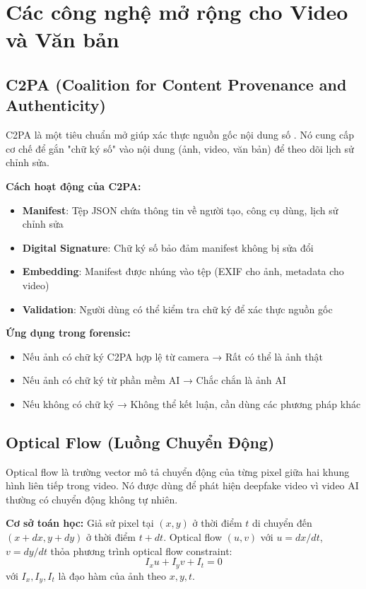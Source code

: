 \documentclass[14pt,a4paper,oneside]{report}
\begin{document}
\section{Các công nghệ mở rộng cho Video và Văn bản}

\subsection{C2PA (Coalition for Content Provenance and Authenticity)}
C2PA là một tiêu chuẩn mở giúp xác thực nguồn gốc nội dung số \cite{c2pa}. Nó cung cấp cơ chế để gắn "chữ ký số" vào nội dung (ảnh, video, văn bản) để theo dõi lịch sử chỉnh sửa.

\textbf{Cách hoạt động của C2PA:}
\begin{itemize}
  \item \textbf{Manifest}: Tệp JSON chứa thông tin về người tạo, công cụ dùng, lịch sử chỉnh sửa
  \item \textbf{Digital Signature}: Chữ ký số bảo đảm manifest không bị sửa đổi
  \item \textbf{Embedding}: Manifest được nhúng vào tệp (EXIF cho ảnh, metadata cho video)
  \item \textbf{Validation}: Người dùng có thể kiểm tra chữ ký để xác thực nguồn gốc
\end{itemize}

\textbf{Ứng dụng trong forensic:}
\begin{itemize}
  \item Nếu ảnh có chữ ký C2PA hợp lệ từ camera → Rất có thể là ảnh thật
  \item Nếu ảnh có chữ ký từ phần mềm AI → Chắc chắn là ảnh AI
  \item Nếu không có chữ ký → Không thể kết luận, cần dùng các phương pháp khác
\end{itemize}

\subsection{Optical Flow (Luồng Chuyển Động)}
Optical flow là trường vector mô tả chuyển động của từng pixel giữa hai khung hình liên tiếp trong video. Nó được dùng để phát hiện deepfake video vì video AI thường có chuyển động không tự nhiên.

\textbf{Cơ sở toán học:}
Giả sử pixel tại $(x,y)$ ở thời điểm $t$ di chuyển đến $(x+dx, y+dy)$ ở thời điểm $t+dt$. Optical flow $(u,v)$ với $u=dx/dt$, $v=dy/dt$ thỏa phương trình optical flow constraint:
\[
I_x u + I_y v + I_t = 0
\]
với $I_x, I_y, I_t$ là đạo hàm của ảnh theo $x, y, t$.
\end{document}
